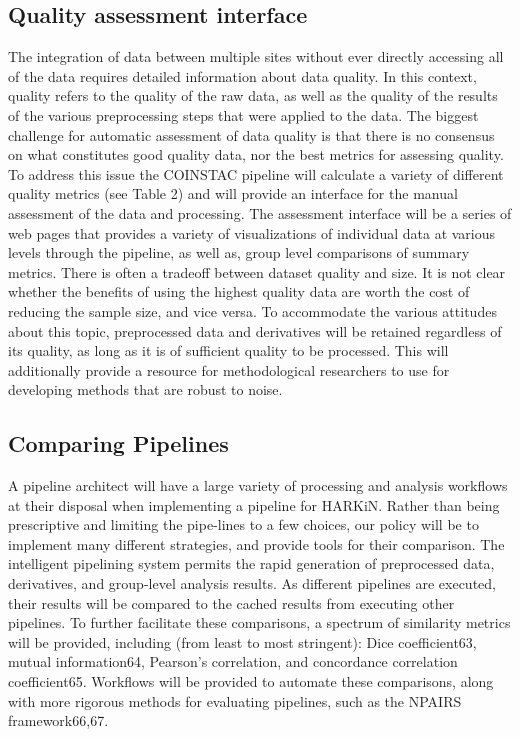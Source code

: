\subsection{Quality assessment interface}
The integration of data between multiple sites without ever directly accessing all of the data requires detailed information about data quality. In this context, quality refers to the quality of the raw data, as well as the quality of the results of the various preprocessing steps that were applied to the data. The biggest challenge for automatic assessment of data quality is that there is no consensus on what constitutes good quality data, nor the best metrics for assessing quality. To address this issue the COINSTAC pipeline will calculate a variety of different quality metrics (see Table 2) and will provide an interface for the manual assessment of the data and processing. The assessment interface will be a series of web pages that provides a variety of visualizations of individual data at various levels through the pipeline, as well as, group level comparisons of summary metrics. There is often a tradeoff between dataset quality and size. It is not clear whether the benefits of using the highest quality data are worth the cost of reducing the sample size, and vice versa. To accommodate the various attitudes about this topic, preprocessed data and derivatives will be retained regardless of its quality, as long as it is of sufficient quality to be processed. This will additionally provide a resource for methodological researchers to use for developing methods that are robust to noise.

\subsection{Comparing Pipelines} 
A pipeline architect will have a large variety of processing and analysis workflows at their disposal when implementing a pipeline for HARKiN. Rather than being prescriptive and limiting the pipe-lines to a few choices, our policy will be to implement many different strategies, and provide tools for their comparison. The intelligent pipelining system permits the rapid generation of preprocessed data, derivatives, and group-level analysis results. As different pipelines are executed, their results will be compared to the cached results from executing other pipelines. To further facilitate these comparisons, a spectrum of similarity metrics will be provided, including (from least to most stringent): Dice coefficient63, mutual information64, Pearson’s correlation, and concordance correlation coefficient65. Workflows will be provided to automate these comparisons, along with more rigorous methods for evaluating pipelines, such as the NPAIRS framework66,67. 

